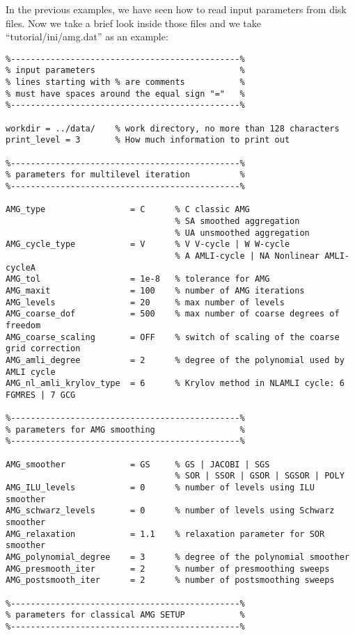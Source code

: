 \documentclass[11pt]{memoir}
\begin{document}
In the previous examples, we have seen how to read input parameters from disk files. Now we take a brief look inside those files and we take ``tutorial/ini/amg.dat'' as an example:
%
\begin{lstlisting}
%----------------------------------------------%
% input parameters                             %
% lines starting with % are comments           %
% must have spaces around the equal sign "="   %
%----------------------------------------------%

workdir = ../data/    % work directory, no more than 128 characters
print_level = 3       % How much information to print out

%----------------------------------------------%
% parameters for multilevel iteration          %
%----------------------------------------------%

AMG_type                 = C      % C classic AMG
                                  % SA smoothed aggregation
                                  % UA unsmoothed aggregation
AMG_cycle_type           = V      % V V-cycle | W W-cycle
                                  % A AMLI-cycle | NA Nonlinear AMLI-cycleA
AMG_tol                  = 1e-8   % tolerance for AMG
AMG_maxit                = 100    % number of AMG iterations
AMG_levels               = 20     % max number of levels
AMG_coarse_dof           = 500    % max number of coarse degrees of freedom
AMG_coarse_scaling       = OFF    % switch of scaling of the coarse grid correction
AMG_amli_degree          = 2      % degree of the polynomial used by AMLI cycle
AMG_nl_amli_krylov_type  = 6      % Krylov method in NLAMLI cycle: 6 FGMRES | 7 GCG

%----------------------------------------------%
% parameters for AMG smoothing                 %
%----------------------------------------------%

AMG_smoother             = GS     % GS | JACOBI | SGS
                                  % SOR | SSOR | GSOR | SGSOR | POLY
AMG_ILU_levels           = 0      % number of levels using ILU smoother
AMG_schwarz_levels       = 0      % number of levels using Schwarz smoother
AMG_relaxation           = 1.1    % relaxation parameter for SOR smoother
AMG_polynomial_degree    = 3      % degree of the polynomial smoother
AMG_presmooth_iter       = 2      % number of presmoothing sweeps
AMG_postsmooth_iter      = 2      % number of postsmoothing sweeps

%----------------------------------------------%
% parameters for classical AMG SETUP           %
%----------------------------------------------%


\end{lstlisting}
\end{document}
